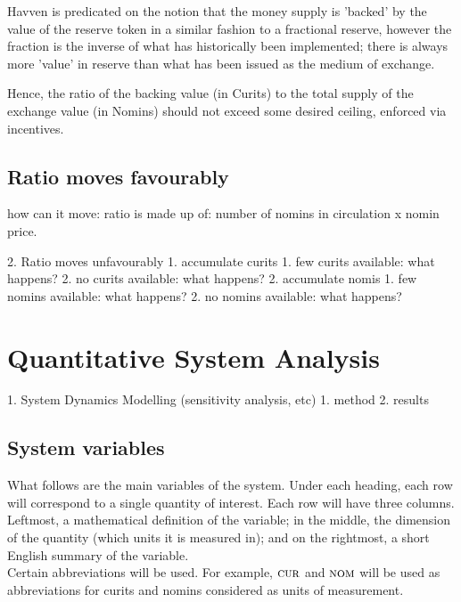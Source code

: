 \documentclass{article}
\begin{document}
Havven is predicated on the notion that the money supply is 'backed' by the value of the reserve token in a similar fashion to a fractional reserve, however the fraction is the inverse of what has historically been implemented; there is always more 'value' in reserve than what has been issued as the medium of exchange.

\noindent Hence, the ratio of the backing value (in Curits) to the total supply of the exchange value (in Nomins) should not exceed some desired ceiling, enforced via incentives.

\subsection{Ratio moves favourably}

how can it move: ratio is made up of:
 number of nomins in circulation   x   nomin price.


2. Ratio moves unfavourably
   1. accumulate curits
      1. few curits available: what happens?
      2. no curits available: what happens?
   2. accumulate nomis
      1. few nomins available: what happens?
      2. no nomins available: what happens?





\pagebreak
\section{Quantitative System Analysis}

1. System Dynamics Modelling (sensitivity analysis, etc)
   1. method
   2. results



\hfill
\subsection{System variables}
\noindent What follows are the main variables of the system. 
Under each heading, each row will correspond to a single quantity of interest.
Each row will have three columns. Leftmost, a mathematical definition of the variable; in the middle, the dimension of the quantity (which units it is measured in); and on the rightmost, a short English summary of the variable.\\

\noindent Certain abbreviations will be used.
For example, \(\textsc{cur}{}\) and \(\textsc{nom}{}\) will be used as abbreviations for curits and nomins considered as units of measurement. \\
\end{document}

